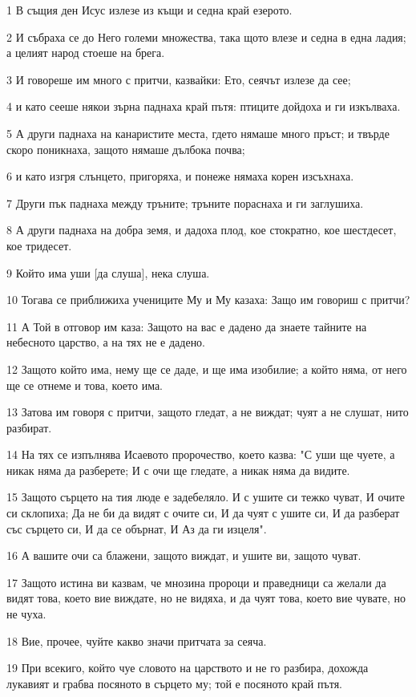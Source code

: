 \par 1 В същия ден Исус излезе из къщи и седна край езерото.
\par 2 И събраха се до Него големи множества, така щото влезе и седна в една ладия; а целият народ стоеше на брега.
\par 3 И говореше им много с притчи, казвайки: Ето, сеячът излезе да сее;
\par 4 и като сееше някои зърна паднаха край пътя: птиците дойдоха и ги изкълваха.
\par 5 А други паднаха на канаристите места, гдето нямаше много пръст; и твърде скоро поникнаха, защото нямаше дълбока почва;
\par 6 и като изгря слънцето, пригоряха, и понеже нямаха корен изсъхнаха.
\par 7 Други пък паднаха между тръните; тръните пораснаха и ги заглушиха.
\par 8 А други паднаха на добра земя, и дадоха плод, кое стократно, кое шестдесет, кое тридесет.
\par 9 Който има уши [да слуша], нека слуша.
\par 10 Тогава се приближиха учениците Му и Му казаха: Защо им говориш с притчи?
\par 11 А Той в отговор им каза: Защото на вас е дадено да знаете тайните на небесното царство, а на тях не е дадено.
\par 12 Защото който има, нему ще се даде, и ще има изобилие; а който няма, от него ще се отнеме и това, което има.
\par 13 Затова им говоря с притчи, защото гледат, а не виждат; чуят а не слушат, нито разбират.
\par 14 На тях се изпълнява Исаевото пророчество, което казва: "С уши ще чуете, а никак няма да разберете; И с очи ще гледате, а никак няма да видите.
\par 15 Защото сърцето на тия люде е задебеляло. И с ушите си тежко чуват, И очите си склопиха; Да не би да видят с очите си, И да чуят с ушите си, И да разберат със сърцето си, И да се обърнат, И Аз да ги изцеля".
\par 16 А вашите очи са блажени, защото виждат, и ушите ви, защото чуват.
\par 17 Защото истина ви казвам, че мнозина пророци и праведници са желали да видят това, което вие виждате, но не видяха, и да чуят това, което вие чувате, но не чуха.
\par 18 Вие, прочее, чуйте какво значи притчата за сеяча.
\par 19 При всекиго, който чуе словото на царството и не го разбира, дохожда лукавият и грабва посяното в сърцето му; той е посяното край пътя.
